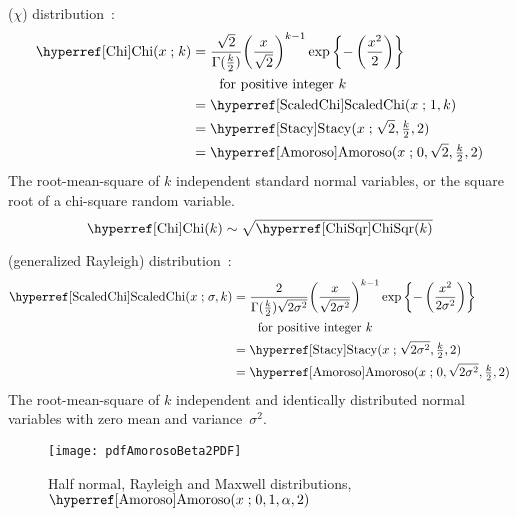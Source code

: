  ($\chi$) distribution~\cite{Johnson1994}:
%
\begin{align}
\label{Chi}
\opr{Chi}(x \given k) 
&= \frac{ \sqrt{2}}{\Gamma(\tfrac{k}{2})} { \left(\frac{x}{\sqrt{2}}\right)}^{k-1} 
\exp\left\{ -\left( \frac{x^2}{2}    \right)\right\} \checked
\\
& \qquad \text{for positive integer } k \notag \\
& = \opr{ScaledChi}(x\given 1,k) \notag \checked \\
&=  \opr{Stacy}(x\given \sqrt{2}, \sfrac{k}{2}, 2)  \notag \checked \\
&=  \opr{Amoroso}(x\given  0, \sqrt{2} , \sfrac{k}{2}, 2) \notag \checked
\end{align}
The root-mean-square of $k$ independent standard normal variables, or the square root of a chi-square random variable.
\[
\opr{Chi}(k) \sim \sqrt{\opr{ChiSqr}(k)} \checked
\notag
\]

 (generalized Rayleigh) distribution~\cite{Miller1964,Johnson1994}:
\begin{align}
\opr{ScaledChi}(x \given \sigma, k) 
&= \frac{2}{\Gamma(\tfrac{k}{2}) \sqrt{2\sigma^2}} { \left(\frac{x}{\sqrt{2\sigma^2}}\right)}^{k-1} 
\exp\left\{-\left(\frac{x^2}{2\sigma^2}\right)\right\} 
\notag \checked
\\
& \qquad \text{for positive integer } k \notag \checked \\
&=  \opr{Stacy}(x\given \sqrt{2\sigma^2}, \tfrac{k}{2},2)  \checked
\label{ScaledChi}
\\
&=  \opr{Amoroso}(x \given 0, \sqrt{2\sigma^2}, \tfrac{k}{2}, 2) \checked
\notag 
\end{align}
The root-mean-square of $k$ independent and identically distributed normal variables with zero mean and variance~$\sigma^2$. 


\begin{figure}[t]
\begin{center}
\texttt{[image: pdfAmorosoBeta2PDF]}
\end{center}
\caption[Half normal, Rayleigh and Maxwell distributions]{Half normal, Rayleigh and Maxwell distributions, $\opr{Amoroso}(x\given 0,1,\alpha,2)$}
\end{figure}



